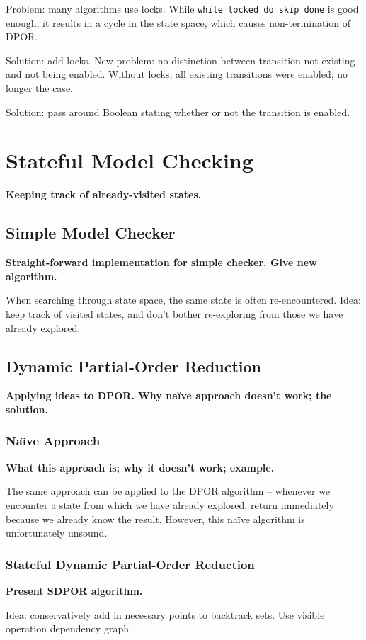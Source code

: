 \documentclass[12pt,a4paper,twoside,openright]{report}
\begin{document}
Problem: many algorithms use locks. While \texttt{while locked do skip done}
is good enough, it results in a cycle in the state space, which causes
non-termination of DPOR.

Solution: add locks. New problem: no distinction between
transition not existing and not being enabled. Without
locks, all existing transitions were enabled; no longer
the case.

Solution: pass around Boolean stating whether or not the transition
is enabled.

\section{Stateful Model Checking}
\textbf{Keeping track of already-visited states.}

\subsection{Simple Model Checker}
\textbf{Straight-forward implementation for simple
	checker. Give new algorithm.}

When searching through state space, the same state is often
re-encountered. Idea: keep track of visited states, and don't bother
re-exploring from those we have already explored.

\subsection{Dynamic Partial-Order Reduction}
\textbf{Applying ideas to DPOR. Why na\"{i}ve
	approach doesn't work; the solution.}

\subsubsection{Na\"{\i}ve Approach}
\textbf{What this approach is; why it doesn't
	work; example.}

The same approach can be applied to
the DPOR algorithm -- whenever we
encounter a state from which we have already
explored, return immediately because we
already know the result. However, this
na\"ive algorithm is unfortunately unsound.

\subsubsection{Stateful Dynamic Partial-Order Reduction}
\textbf{Present SDPOR algorithm.}

Idea: conservatively add in necessary points to backtrack sets.
Use visible operation dependency graph.
\end{document}

